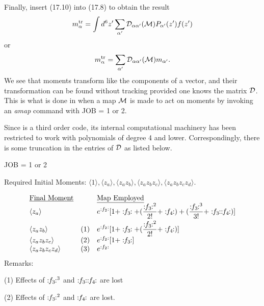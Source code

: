 Finally, insert (17.10) into (17.8) to obtain the result
\begin{equation}
m^{\rm tr}_{\alpha} = \int d^6 z^{\prime}  \sum_{\alpha^{\prime}} {\cal D}_{\alpha \alpha^{\prime}} ({\cal M}) P_{\alpha^{\prime}}(z^{\prime}) f(z^{\prime})
\end{equation}
or
\begin{equation}
m^{\rm tr}_{\alpha} = \sum_{\alpha^{\prime}} {\cal D}_{\alpha \alpha^{\prime}} ({\cal M}) m_{\alpha^{\prime}}.
\end{equation}
We see that moments transform like the components of a vector, and their transformation can be found without tracking provided one  knows the matrix ${\cal D}$.  This is what is done in \Mary when a map ${\cal M}$ is made to act on moments by invoking an {\em amap} command with JOB = 1 or 2.

Since  is a third order code, its internal computational machinery has been restricted to work with polynomials of degree 4 and lower.  Correspondingly, there is some truncation in the entries of ${\cal D}$ as listed below.

\begin{center}
                             JOB = 1 or 2

Required Initial Moments:  $\displaystyle \langle 1\rangle , \langle z_a\rangle , \langle z_a z_b\rangle , \langle z_a z_b z_c\rangle , \langle z_a z_b z_c z_d\rangle .$
\end{center}
\[ \begin{array}{lll}
\mbox{\underline{Final Moment}}   & &   \mbox{\underline{Map Employed}}\\
\langle z_a\rangle          & &  \displaystyle    e^{:f_2:}[1+\Lieop(f_3)
+ (\frac{\Lieop(f_3)^2}{2!} + \Lieop(f_4)) + (\frac{\Lieop(f_3)^3}{3!} +
\Lieop(f_3)\Lieop(f_4))]\vspace{1mm}\\
\langle z_a z_b\rangle      & (1)  & \displaystyle e^{:f_2:}[1+\Lieop(f_3) + (\frac{\Lieop(f_3)^2}{2!} + \Lieop(f_4))]\\
\langle z_a z_b z_c\rangle  &  (2)   & e^{:f_2:} [1 + \Lieop(f_3)]\\
\langle z_a z_b z_c z_d\rangle  & (3) &   e^{:f_2:}
\end{array} \]
Remarks:

(1)  Effects of $\Lieop(f_3)^3$ and $\Lieop(f_3) \Lieop(f_4)$ are lost

(2)  Effects of $\Lieop(f_3)^2$ and $\Lieop(f_4)$ are lost.

